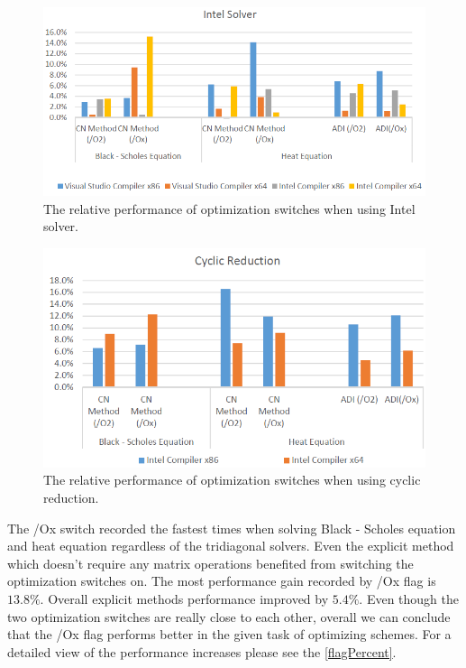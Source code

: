 \documentclass[12pt, oneside]{book}
\theoremstyle{plain}
\theoremstyle{definition}
\begin{document}
\begin{figure}[!htb]
    \label{intelBar}
    \centering
        \includegraphics[scale=0.6]{intelFlagBar.png}
    \caption{The relative performance of optimization switches when using Intel solver.}
\end{figure} 

\begin{figure}[!htb]
    \label{cyclicBar}
    \centering
        \includegraphics[scale=0.6]{cyclicFlagBar.png}
    \caption{The relative performance of optimization switches when using cyclic reduction.}
\end{figure}

The /Ox switch recorded the fastest times when solving Black - Scholes equation and heat equation regardless of the tridiagonal solvers. Even the explicit method which doesn't require any matrix operations benefited from switching the optimization switches on. The most performance gain recorded by /Ox flag is $13.8 \%$. Overall explicit methods performance improved by $5.4 \%$. Even though the two optimization switches are really close to each other, overall we can conclude that the /Ox flag performs better in the given task  of optimizing schemes. For a detailed view of the performance increases please see the \ref{flagPercent}.
\end{document}
